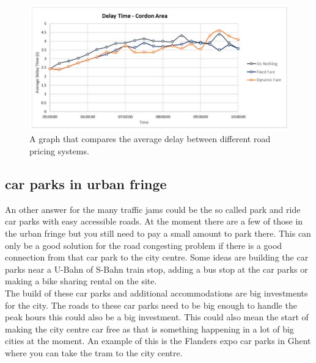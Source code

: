 \begin{figure}[h!]
	\centering
	\includegraphics[width=0.55\textheight]{ProblemsFigures/dynamicRoadPricing}
	\caption{A graph that compares the average delay between different road pricing systems. }
	\label{fig:dynroad}
\end{figure}

\subsection{car parks in urban fringe} \label{subsec:parkin}
An other answer for the many traffic jams could be the so called park and ride car parks with easy accessible roads. At the moment there are a few of those in the urban fringe but you still need to pay a small amount to park there. This can only be a good solution for the road congesting problem if there is a good connection from that car park to the city centre. Some ideas are building the car parks near a U-Bahn of S-Bahn train stop, adding a bus stop at the car parks or making a bike sharing rental on the site. \\ \newline 
The build of these car parks and additional accommodations are big investments for the city. The roads to these car parks need to be big enough to handle the peak hours this could also be a big investment. This could also mean the start of making the city centre car free as that is something happening in a lot of big cities at the moment. An example of this is the Flanders expo car parks in Ghent where you can take the tram to the city centre. 

